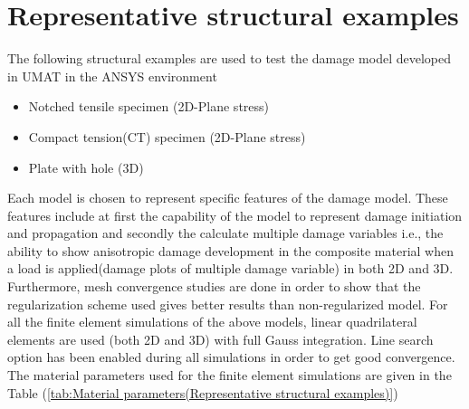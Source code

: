 \documentclass[a4paper,12pt,twoside]{report}
\begin{document}
\section{Representative structural examples}
\indent\indent\indent The following structural examples are used to test the damage model developed in UMAT in the ANSYS environment
\begin{itemize}
\item Notched tensile specimen (2D-Plane stress)
\item Compact tension(CT) specimen (2D-Plane stress)
\item Plate with hole (3D)
\end{itemize}
Each model is chosen to represent specific features of the damage model. These features include at first the capability of the model to represent damage initiation and propagation and secondly the calculate multiple damage variables i.e., the ability to show anisotropic damage development in the composite material when a load is applied(damage plots of multiple damage variable) in both 2D and 3D. Furthermore, mesh convergence studies are done in order to show that the regularization scheme used gives better results than non-regularized model. For all the finite element simulations of the above models, linear quadrilateral elements are used (both 2D and 3D) with full Gauss integration. Line search option has been enabled during all simulations in order to get good convergence. The material parameters used for the finite element simulations are given in the Table (\ref{tab:Material parameters(Representative structural examples)})
\end{document}
